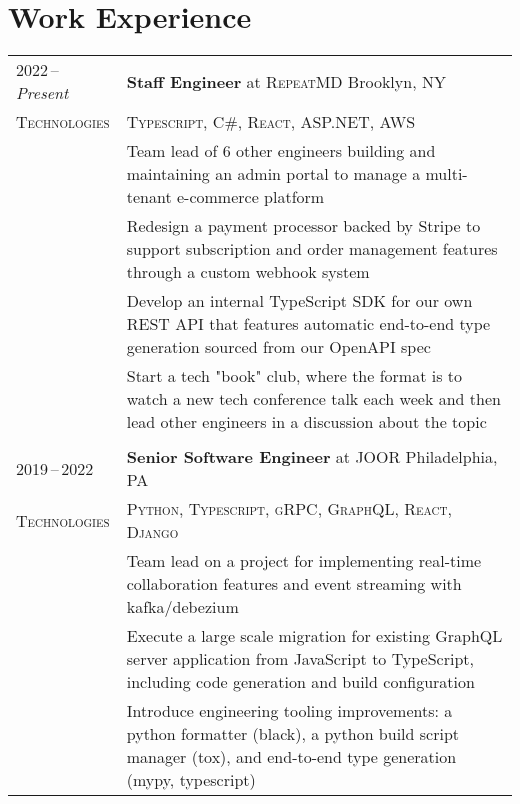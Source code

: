 \documentclass[a4paper,12pt]{article}
\begin{document}
\section{Work Experience}
\begin{tabularx}{\textwidth}{@{\extracolsep{2pt}}p{7em}|X@{}}
    2022\,--\,\emph{Present} & \textbf{Staff Engineer} at \textsc{RepeatMD} \hfill Brooklyn, NY                                                                                                             \\
    \textsc{Technologies}    & \textsc{Typescript}, \textsc{C\#}, \textsc{React}, \textsc{ASP.NET}, \textsc{AWS}                                                                                            \\
                             & \footnotesize Team lead of 6 other engineers building and maintaining an admin portal to manage a multi-tenant e-commerce platform                                           \\
                             & \footnotesize Redesign a payment processor backed by Stripe to support subscription and order management features through a custom webhook system                            \\
                             & \footnotesize Develop an internal TypeScript SDK for our own REST API that features automatic end-to-end type generation sourced from our OpenAPI spec                       \\
                             & \footnotesize Start a tech "book" club, where the format is to watch a new tech conference talk each week and then lead other engineers in a discussion about the topic      \\

    \multicolumn{2}{c}{}                                                                                                                                                                                    \\

    2019\,--\,2022           & \textbf{Senior Software Engineer} at \textsc{JOOR} \hfill Philadelphia, PA                                                                                                   \\
    \textsc{Technologies}    & \textsc{Python}, \textsc{Typescript}, \textsc{gRPC}, \textsc{GraphQL}, \textsc{React}, \textsc{Django}                                                                       \\
                             & \footnotesize Team lead on a project for implementing real-time collaboration features and event streaming with kafka/debezium                                               \\
                             & \footnotesize Execute a large scale migration for existing GraphQL server application from JavaScript to TypeScript, including code generation and build configuration       \\
                             & \footnotesize Introduce engineering tooling improvements: a python formatter (black), a python build script manager (tox), and end-to-end type generation (mypy, typescript) \\


\end{tabularx}
\end{document}
